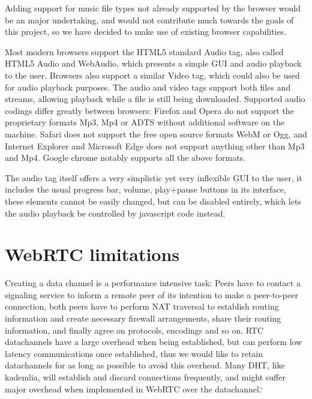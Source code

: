 Adding support for music file types not already supported by the browser 
would be an major undertaking, 
and would not contribute much towards the goals of this project, 
so we have decided to make use of existing browser capabilities.
\newline

Most modern browsers support the \acs{HTML}5 standard Audio tag,
also called \acs{HTML}5 Audio and WebAudio,
which presents a simple \acs{GUI} and audio playback to the user.
Browsers also support a similar Video tag, 
which could also be used for audio playback purposes.
The audio and video tags support both files and streams, 
allowing playback while a file is still being downloaded.
\newline
Supported audio codings differ greatly between browsers:
Firefox and Opera do not support the proprietary formats Mp3, Mp4 or ADTS
without additional software on the machine.
Safari does not support the free open source formats WebM or Ogg,
and Internet Explorer and Microsoft Edge does not support anything other than Mp3 and Mp4.
Google chrome notably supports all the above formats.
\newline

The audio tag itself offers a very simplistic yet very inflexible \acs{GUI} to the user, 
it includes the usual progress bar, volume, play+pause buttons in its interface, 
these elements cannot be easily changed, but can be disabled entirely, 
which lets the audio playback be controlled by javascript code instead.
\newline



\section{WebRTC limitations}

Creating a data channel is a performance intensive task:
Peers have to contact a signaling service to inform a remote peer of its intention
to make a peer-to-peer connection, both peers have to perform NAT traversal to establish routing information 
and create necessary firewall arrangements, share their routing information,
and finally agree on protocols, encodings and so on.
RTC datachannels have a large overhead when being established,
but can perform low latency communications once established, 
thus we would like to retain datachannels for as long as possible to avoid this overhead.
Many \acs{DHT}, like kademlia, will establish and discard connections frequently,
and might suffer major overhead when implemented in WebRTC over the datachannel.`

